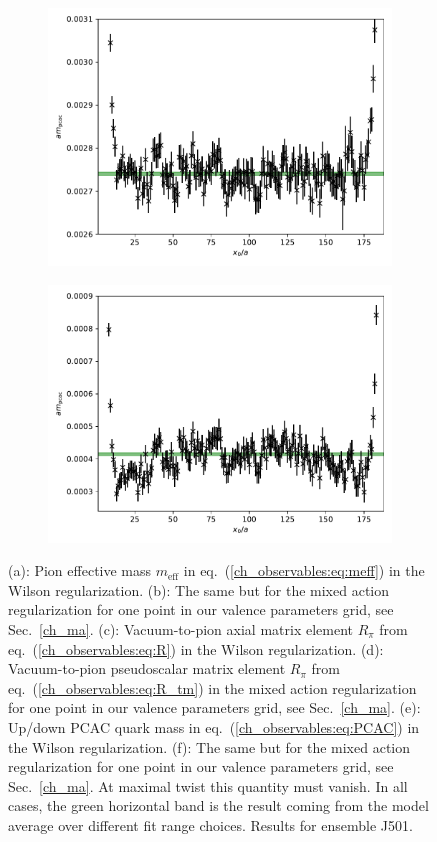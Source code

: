 \begin{figure}
\begin{subfigure}{.49\textwidth}
    	\includegraphics[width=\textwidth]{./cap3/figs/J501_mpcac.pdf}
    	\caption{}
    \end{subfigure}
    \begin{subfigure}{.49\textwidth}
    	\includegraphics[width=\textwidth]{./cap3/figs/J501_mpcac_tm.pdf}
    	\caption{}
    \end{subfigure}
    \caption{(a): Pion effective mass $m_{\textrm{eff}}$ in eq.~(\ref{ch_observables:eq:meff}) in the Wilson regularization. (b): The same but for the mixed action regularization for one point in our valence parameters grid, see Sec.~\ref{ch_ma}. (c): Vacuum-to-pion axial matrix element $R_{\pi}$ from eq.~(\ref{ch_observables:eq:R}) in the Wilson regularization. (d): Vacuum-to-pion pseudoscalar matrix element $R_{\pi}$ from eq.~(\ref{ch_observables:eq:R_tm}) in the mixed action regularization for one point in our valence parameters grid, see Sec.~\ref{ch_ma}. (e): Up/down PCAC quark mass in eq.~(\ref{ch_observables:eq:PCAC}) in the Wilson regularization. (f): The same but for the mixed action regularization for one point in our valence parameters grid, see Sec.~\ref{ch_ma}. At maximal twist this quantity must vanish. In all cases, the green horizontal band is the result coming from the model average over different fit range choices. Results for ensemble J501.}
        \label{ch_observables:fig:meff}
\end{figure}

